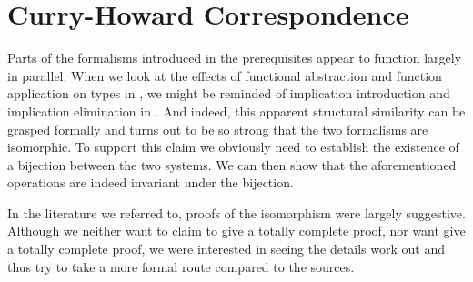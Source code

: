 \chapter{Curry-Howard Correspondence}

Parts of the formalisms introduced in the prerequisites appear to function
largely in parallel. When we look at the effects of functional abstraction and
function application on types in \stlambda, we might be reminded of implication
introduction and implication elimination in \implnpi. And indeed, this apparent
structural similarity can be grasped formally and turns out to be so strong that
the two formalisms are isomorphic. To support this claim we obviously need to
establish the existence of a bijection between the two systems. We can then show
that the aforementioned operations are indeed invariant under the bijection.

In the literature we referred to, proofs of the isomorphism were largely
suggestive. Although we neither want to claim to give a totally complete proof,
nor want give a totally complete proof, we were interested in seeing the details
work out and thus try to take a more formal route compared to the sources.





